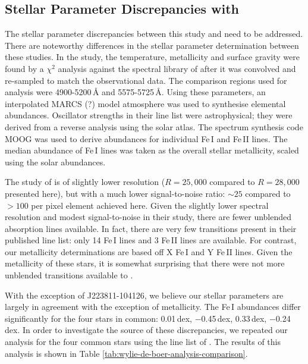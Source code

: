 \documentclass{emulateapj}
\begin{document}
\subsection{Stellar Parameter Discrepancies with \citet{wylie-de-boer;et-al_2012}}

The stellar parameter discrepancies between this study and \citet{wylie-de-boer;et-al_2012} need to be addressed. There are noteworthy differences in the stellar parameter determination between these studies. In the \citet{wylie-de-boer;et-al_2012} study, the temperature, metallicity and surface gravity were found by a $\chi^2$ analysis against the spectral library of \citet{munari;et-al_2005} after it was convolved and re-sampled to match the observational data. The comparison regions used for analysis were 4900-5200\,\AA{} and 5575-5725\,\AA{}. Using these parameters, an interpolated MARCS (?) model atmosphere was used to synthesise elemental abundances. Oscillator strengths in their line list were astrophysical; they were derived from a reverse analysis using the \citet{hinkle;et-al_2003} solar atlas. The spectrum synthesis code \textsc{MOOG} was used to derive abundances for individual Fe\,I and Fe\,II lines. The median abundance of Fe\,I lines was taken as the overall stellar metallicity, scaled using the \citet{Grevesse;Sauval_1998} solar abundances.

The study of \citet{wylie-de-boer;et-al_2012} is of slightly lower resolution ($R = 25,000$ compared to $R = 28,000$ presented here), but with a much lower signal-to-noise ratio: $\sim{}25$ compared to $>100$ per pixel element achieved here. Given the slightly lower spectral resolution and modest signal-to-noise in their study, there are fewer unblended absorption lines available. In fact, there are very few transitions present in their published line list: only 14 Fe\,I lines and 3 Fe\,II lines are available. For contrast, our metallicity determinations are based off X Fe\,I and Y Fe\,II lines. Given the metallicity of these stars, it is somewhat surprising that there were not more unblended transitions available to \citet{wylie-de-boer;et-al_2012}.

With the exception of J223811-104126, we believe our stellar parameters are largely in agreement with the exception of metallicity. The Fe\,I abundances differ significantly for the four stars in common: 0.01\,dex, $-$0.45\,dex, 0.33\,dex, $-$0.24\,dex. In order to investigate the source of these discrepancies, we repeated our analysis for the four common stars using the line list of \citet{wylie-de-boer;et-al_2012}. The results of this analysis is shown in Table \ref{tab:wylie-de-boer-analysis-comparison}. 
\end{document}
